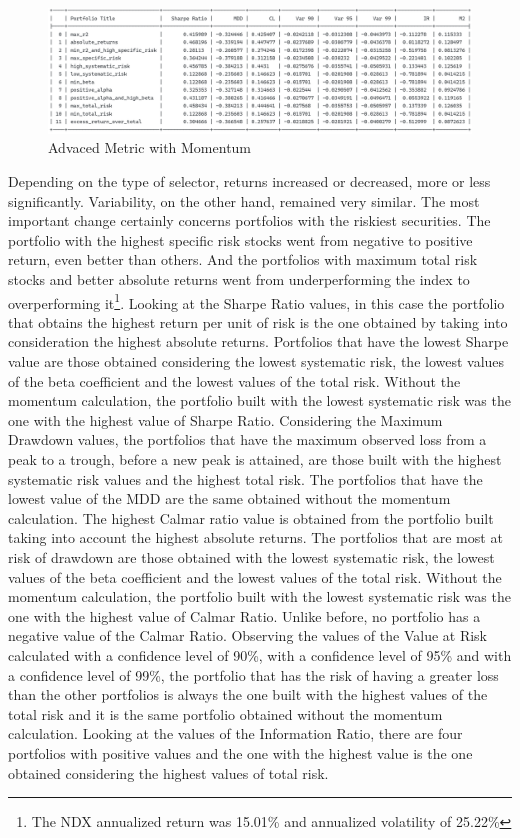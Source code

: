 \documentclass[twocolumn]{article}
\begin{document}
\begin{figure}[t]
\centering\includegraphics[scale=0.5]{momentumAdvance.png}
\caption{Advaced Metric with Momentum}
\end{figure}
Depending on the type of selector, returns increased or decreased, more or less significantly. Variability, on the other hand, remained very similar. The most important change certainly concerns portfolios with the riskiest securities. The portfolio with the highest specific risk stocks went from negative to positive return, even better than others. And the portfolios with maximum total risk stocks and better absolute returns went from underperforming the index to overperforming it\footnote{The NDX annualized return was 15.01\% and annualized volatility of 25.22\%}. Looking at the Sharpe Ratio values, in this case the portfolio that obtains the highest return per unit of risk is the one obtained by taking into consideration the highest absolute returns. Portfolios that have the lowest Sharpe value are those obtained considering the lowest systematic risk, the lowest values of the beta coefficient and the lowest values of the total risk. Without the momentum calculation, the portfolio built with the lowest systematic risk was the one with the highest value of Sharpe Ratio. Considering the Maximum Drawdown values, the portfolios that have the maximum observed loss from a peak to a trough, before a new peak is attained, are those built with the highest systematic risk values and the highest total risk. The portfolios that have the lowest value of the MDD are the same obtained without the momentum calculation. The highest Calmar ratio value is obtained from the portfolio built taking into account the highest absolute returns. The portfolios that are most at risk of drawdown are those obtained with the lowest systematic risk, the lowest values of the beta coefficient and the lowest values of the total risk. Without the momentum calculation, the portfolio built with the lowest systematic risk was the one with the highest value of Calmar Ratio. Unlike before, no portfolio has a negative value of the Calmar Ratio. Observing the values of the Value at Risk calculated with a confidence level of 90\%, with a confidence level of 95\% and with a confidence level of 99\%, the portfolio that has the risk of having a greater loss than the other portfolios is always the one built with the highest values of the total risk and it is the same portfolio obtained without the momentum calculation. Looking at the values of the Information Ratio, there are four portfolios with positive values and the one with the highest value is the one obtained considering the highest values of total risk. 
\end{document}
